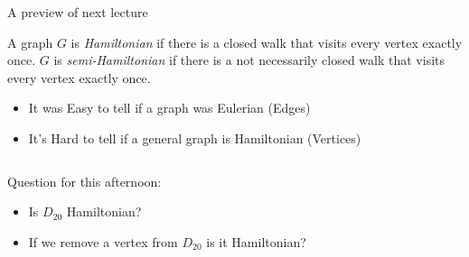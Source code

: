 \documentclass{beamer}
\begin{document}
\begin{frame}{A preview of next lecture}
  \begin{definition}A graph $G$ is \emph{Hamiltonian} if there is a closed walk that visits every vertex exactly once. $G$ is \emph{semi-Hamiltonian} if there is a not necessarily closed walk that visits every vertex exactly once.
  \end{definition}
  \begin{itemize}
     \item It was Easy to tell if a graph was Eulerian (Edges)
     \item It's Hard to tell if a general graph is Hamiltonian (Vertices)
  \end{itemize}
  \begin{columns}
     \begin{column}{.5\textwidth}
        \begin{block}{Question for this afternoon:}
\begin{itemize}
\item     Is $D_{20}$ Hamiltonian? 
\item     If we remove a vertex from $D_{20}$ is it Hamiltonian?
  \end{itemize}
        \end{block}
     \end{column}
     \begin{column}{.5\textwidth}
\begin{center}    \end{center}
  \end{column}
\end{columns}
\end{frame}
\end{document}
